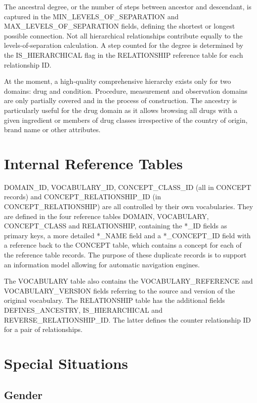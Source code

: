 \documentclass[11pt]{book}
\theoremstyle{definition}
\theoremstyle{definition}
\theoremstyle{definition}
\theoremstyle{remark}
\begin{document}
The ancestral degree, or the number of steps between ancestor and
descendant, is captured in the MIN\_LEVELS\_OF\_SEPARATION and
MAX\_LEVELS\_OF\_SEPARATION fields, defining the shortest or longest
possible connection. Not all hierarchical relationships contribute
equally to the levels-of-separation calculation. A step counted for the
degree is determined by the IS\_HIERARCHICAL flag in the RELATIONSHIP
reference table for each relationship ID.

At the moment, a high-quality comprehensive hierarchy exists only for
two domains: drug and condition. Procedure, measurement and observation
domains are only partially covered and in the process of construction.
The ancestry is particularly useful for the drug domain as it allows
browsing all drugs with a given ingredient or members of drug classes
irrespective of the country of origin, brand name or other attributes.

\section{Internal Reference Tables}\label{internal-reference-tables}

DOMAIN\_ID, VOCABULARY\_ID, CONCEPT\_CLASS\_ID (all in CONCEPT records)
and CONCEPT\_RELATIONSHIP\_ID (in CONCEPT\_RELATIONSHIP) are all
controlled by their own vocabularies. They are defined in the four
reference tables DOMAIN, VOCABULARY, CONCEPT\_CLASS and RELATIONSHIP,
containing the *\_ID fields as primary keys, a more detailed *\_NAME
field and a *\_CONCEPT\_ID field with a reference back to the CONCEPT
table, which contains a concept for each of the reference table records.
The purpose of these duplicate records is to support an information
model allowing for automatic navigation engines.

The VOCABULARY table also contains the VOCABULARY\_REFERENCE and
VOCABULARY\_VERSION fields referring to the source and version of the
original vocabulary. The RELATIONSHIP table has the additional fields
DEFINES\_ANCESTRY, IS\_HIERARCHICAL and REVERSE\_RELATIONSHIP\_ID. The
latter defines the counter relationship ID for a pair of relationships.

\section{Special Situations}\label{specialSituations}

\subsection{Gender}\label{gender}
\end{document}
